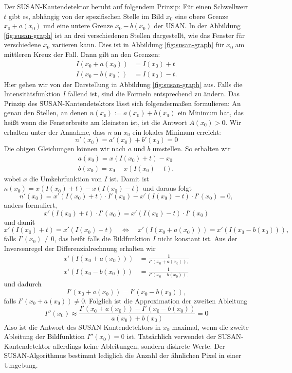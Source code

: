 \documentclass[a4paper, 11pt]{report}
\theoremstyle{definition}
\begin{document}
				Der SUSAN-Kantendetektor beruht auf folgendem Prinzip: Für einen Schwellwert $t$ gibt es, abhängig von der spezifischen Stelle im Bild $x_0$ eine obere Grenze $x_0+a(x_0)$ und eine untere Grenze $x_0-b(x_0)$ der USAN. In der Abbildung \ref{fig:susan-graph} ist an drei verschiedenen Stellen dargestellt, wie das Fenster für verschiedene $x_0$ variieren kann. Dies ist in Abbildung \ref{fig:susan-graph} für $x_0$ am mittleren Kreuz der Fall.
				Dann gilt an den Grenzen:
				\begin{align*}
					I(x_0 + a(x_0)) &= I(x_0) + t \\
					I(x_0 - b(x_0)) &= I(x_0) - t.
				\end{align*}
				Hier gehen wir von der Darstellung in Abbildung \ref{fig:susan-graph} aus. Falls die Intensitätsfunktion $I$ fallend ist, sind die Formeln entsprechend zu ändern.
				Das Prinzip des SUSAN-Kantendetektors lässt sich folgendermaßen formulieren: An genau den Stellen, an denen $n(x_0) := a(x_0) + b(x_0)$ ein Minimum hat, das heißt wenn die Fensterbreite am kleinsten ist, ist die Antwort $A(x_0) > 0$. Wir erhalten unter der Annahme, dass $n$ an $x_0$ ein lokales Minimum erreicht:
				$$ n'(x_0) = a'(x_0) + b'(x_0) = 0 $$
				Die obigen Gleichungen können wir nach $a$ und $b$ umstellen. So erhalten wir
				\begin{align*}
					a(x_0) = x(I(x_0) + t) - x_0 \\
					b(x_0) = x_0 - x(I(x_0) - t),
				\end{align*}
				wobei $x$ die Umkehrfunktion von $I$ ist.
				Damit ist $n(x_0) = x(I(x_0) + t) - x(I(x_0) - t)$ und daraus folgt
				$$ n'(x_0) = x'(I(x_0) + t) \cdot I'(x_0) - x'(I(x_0) - t) \cdot I'(x_0) = 0,$$
				anders formuliert,
				$$ x'(I(x_0) + t) \cdot I'(x_0) = x'(I(x_0) - t) \cdot I'(x_0) $$
				und damit
				$$
					x'(I(x_0) + t) = x'(I(x_0) - t) \quad \iff \quad x'(I(x_0 + a(x_0))) = x'(I(x_0 - b(x_0))),
				$$
				falls $I'(x_0) \neq 0$, das heißt falls die Bildfunktion $I$ nicht konstant ist.
	 			Aus der Inversenregel der Differenzialrechnung erhalten wir
	 			\begin{align*}
	 				x'(I(x_0 + a(x_0))) &= \frac{1}{I'(x_0 + a(x_0)),}\\
	 				x'(I(x_0 - b(x_0))) &= \frac{1}{I'(x_0 - b(x_0)),}
	 			\end{align*}
	 			und dadurch
	 			$$ I'(x_0 + a(x_0)) = I'(x_0 - b(x_0)), $$
	 			falls $I'(x_0 + a(x_0)) \neq 0$.
	 			Folglich ist die Approximation der zweiten Ableitung
	 			$$I''(x_0) \approx \frac{I'(x_0 + a(x_0)) - I'(x_0 - b(x_0))}{a(x_0) + b(x_0)} = 0$$
	 			Also ist die Antwort des SUSAN-Kantendetektors in $x_0$ maximal, wenn die zweite Ableitung der Bildfunktion $I''(x_0) = 0$ ist. Tatsächlich verwendet der SUSAN-Kantendetektor allerdings keine Ableitungen, sondern diskrete Werte. Der SUSAN-Algorithmus bestimmt lediglich die Anzahl der ähnlichen Pixel in einer Umgebung.
\end{document}
